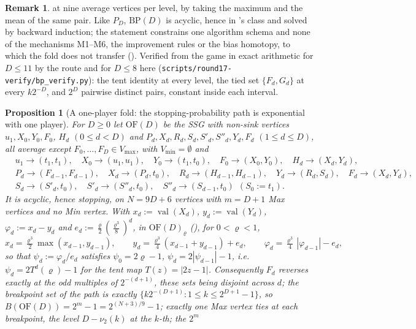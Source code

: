 \documentclass[11pt]{article}
\theoremstyle{plain}
\newtheorem{proposition}[theorem]{Proposition}
\theoremstyle{definition}
\newtheorem{remark}[theorem]{Remark}
\DeclareMathOperator{\val}{val}
\newcommand{\Vmax}{V_{\max}}
\newcommand{\Vmin}{V_{\min}}
\begin{document}
\begin{remark}
at nine average vertices per level, by taking the maximum and the mean of
the same pair. Like $P_D$, $\mathrm{BP}(D)$ is acyclic, hence in
's class and solved by backward induction; the
statement constrains one algorithm schema and none of the mechanisms
M1--M6, the improvement rules or the bias homotopy, to which the fold does
not transfer (). Verified from the game in exact arithmetic for
$D\le11$ by the route and for $D\le8$ here
(\texttt{scripts/round17-verify/bp\_verify.py}): the tent identity at every
level, the tied set $\{F_d,G_d\}$ at every $k2^{-D}$, and $2^{D}$ pairwise
distinct pairs, constant inside each interval.
\end{remark}

\begin{proposition}[A one-player fold: the stopping-probability path is exponential with one player]\label{prop:one-player-fold}
For $D\ge0$ let $\mathrm{OF}(D)$ be the SSG with non-sink vertices
$u_1,X_0,Y_0,F_0$, $H_d$ $(0\le d<D)$ and
$P_d,X_d,R_d,S_d,S'_d,S''_d,Y_d,F_d$ $(1\le d\le D)$, all average except
$F_0,\dots,F_D\in\Vmax$, with $\Vmin=\emptyset$ and
\[
\begin{aligned}
 &u_1\to(t_1,t_1),\quad X_0\to(u_1,u_1),\quad Y_0\to(t_1,t_0),\quad
  F_0\to(X_0,Y_0),\quad H_d\to(X_d,Y_d),\\
 &P_d\to(F_{d-1},F_{d-1}),\quad X_d\to(P_d,t_0),\quad
  R_d\to(H_{d-1},H_{d-1}),\quad Y_d\to(R_d,S_d),\quad F_d\to(X_d,Y_d),\\
 &S_d\to(S'_d,t_0),\quad S'_d\to(S''_d,t_0),\quad
  S''_d\to(S_{d-1},t_0)\ \ (S_0:=t_1).
\end{aligned}
\]
It is acyclic, hence stopping, on $N=9D+6$ vertices with $m=D+1$ Max
vertices and no Min vertex. With $x_d:=\val(X_d)$, $y_d:=\val(Y_d)$,
$\varphi_d:=x_d-y_d$ and $e_d:=\tfrac\varrho2(\tfrac{\varrho^{3}}8)^{d}$, in
$\mathrm{OF}(D)_\varrho$ (), for $0<\varrho<1$,
\[
  x_d=\tfrac{\varrho^{3}}2\max(x_{d-1},y_{d-1}),\qquad
  y_d=\tfrac{\varrho^{3}}4(x_{d-1}+y_{d-1})+e_d,\qquad
  \varphi_d=\tfrac{\varrho^{3}}4\,|\varphi_{d-1}|-e_d ,
\]
so that $\psi_d:=\varphi_d/e_d$ satisfies $\psi_0=2\varrho-1$,
$\psi_d=2|\psi_{d-1}|-1$, i.e.\ $\psi_d=2T^{d}(\varrho)-1$ for the tent map
$T(z)=|2z-1|$. Consequently $F_d$ reverses exactly at the odd multiples of
$2^{-(d+1)}$, these sets being disjoint across $d$; the breakpoint set of the
path is exactly $\{k2^{-(D+1)}:1\le k\le2^{D+1}-1\}$, so
$B(\mathrm{OF}(D))=2^{m}-1=2^{(N+3)/9}-1$; exactly one Max vertex ties at
each breakpoint, the level $D-\nu_2(k)$ at the $k$-th; the $2^{m}$

\end{proposition}
\end{document}
